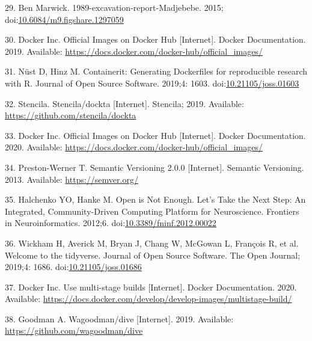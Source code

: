\documentclass[10pt,letterpaper]{article}
\begin{document}
\leavevmode\hypertarget{ref-marwick_madjebebe_2015}{}%
29. Ben Marwick. 1989-excavation-report-Madjebebe. 2015;
doi:\href{https://doi.org/10.6084/m9.figshare.1297059}{10.6084/m9.figshare.1297059}

\leavevmode\hypertarget{ref-docker_inc_official_2019}{}%
30. Docker Inc. Official Images on Docker Hub {[}Internet{]}. Docker
Documentation. 2019. Available:
\url{https://docs.docker.com/docker-hub/official_images/}

\leavevmode\hypertarget{ref-nust_containerit_2019}{}%
31. Nüst D, Hinz M. Containerit: Generating Dockerfiles for reproducible
research with R. Journal of Open Source Software. 2019;4: 1603.
doi:\href{https://doi.org/10.21105/joss.01603}{10.21105/joss.01603}

\leavevmode\hypertarget{ref-stencila_dockta_2019}{}%
32. Stencila. Stencila/dockta {[}Internet{]}. Stencila; 2019. Available:
\url{https://github.com/stencila/dockta}

\leavevmode\hypertarget{ref-docker_inc_official_2020}{}%
33. Docker Inc. Official Images on Docker Hub {[}Internet{]}. Docker
Documentation. 2020. Available:
\url{https://docs.docker.com/docker-hub/official_images/}

\leavevmode\hypertarget{ref-preston-werner_semantic_2013}{}%
34. Preston-Werner T. Semantic Versioning 2.0.0 {[}Internet{]}. Semantic
Versioning. 2013. Available: \url{https://semver.org/}

\leavevmode\hypertarget{ref-halchenko_open_2012}{}%
35. Halchenko YO, Hanke M. Open is Not Enough. Let's Take the Next Step:
An Integrated, Community-Driven Computing Platform for Neuroscience.
Frontiers in Neuroinformatics. 2012;6.
doi:\href{https://doi.org/10.3389/fninf.2012.00022}{10.3389/fninf.2012.00022}

\leavevmode\hypertarget{ref-Wickham2019}{}%
36. Wickham H, Averick M, Bryan J, Chang W, McGowan L, François R, et
al. Welcome to the tidyverse. Journal of Open Source Software. The Open
Journal; 2019;4: 1686.
doi:\href{https://doi.org/10.21105/joss.01686}{10.21105/joss.01686}

\leavevmode\hypertarget{ref-docker_multi-stage_2020}{}%
37. Docker Inc. Use multi-stage builds {[}Internet{]}. Docker
Documentation. 2020. Available:
\url{https://docs.docker.com/develop/develop-images/multistage-build/}

\leavevmode\hypertarget{ref-goodman_dive_2019}{}%
38. Goodman A. Wagoodman/dive {[}Internet{]}. 2019. Available:
\url{https://github.com/wagoodman/dive}
\end{document}
